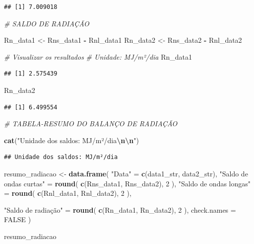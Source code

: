 \documentclass[
]{article}
\newenvironment{Shaded}{\begin{snugshade}}{\end{snugshade}}
\newcommand{\AttributeTok}[1]{\textcolor[rgb]{0.13,0.29,0.53}{#1}}
\newcommand{\CommentTok}[1]{\textcolor[rgb]{0.56,0.35,0.01}{\textit{#1}}}
\newcommand{\ConstantTok}[1]{\textcolor[rgb]{0.56,0.35,0.01}{#1}}
\newcommand{\DecValTok}[1]{\textcolor[rgb]{0.00,0.00,0.81}{#1}}
\newcommand{\FunctionTok}[1]{\textcolor[rgb]{0.13,0.29,0.53}{\textbf{#1}}}
\newcommand{\NormalTok}[1]{#1}
\newcommand{\OtherTok}[1]{\textcolor[rgb]{0.56,0.35,0.01}{#1}}
\newcommand{\SpecialCharTok}[1]{\textcolor[rgb]{0.81,0.36,0.00}{\textbf{#1}}}
\newcommand{\StringTok}[1]{\textcolor[rgb]{0.31,0.60,0.02}{#1}}
\begin{document}
\begin{verbatim}
## [1] 7.009018
\end{verbatim}

\begin{Shaded}
\begin{Highlighting}[]
\CommentTok{\# SALDO DE RADIAÇÃO}

\NormalTok{Rn\_data1 }\OtherTok{\textless{}{-}}\NormalTok{ Rns\_data1 }\SpecialCharTok{{-}}\NormalTok{ Rnl\_data1}
\NormalTok{Rn\_data2 }\OtherTok{\textless{}{-}}\NormalTok{ Rns\_data2 }\SpecialCharTok{{-}}\NormalTok{ Rnl\_data2}

\CommentTok{\# Visualizar os resultados}
\CommentTok{\# Unidade: MJ/m²/dia}
\NormalTok{Rn\_data1}
\end{Highlighting}
\end{Shaded}

\begin{verbatim}
## [1] 2.575439
\end{verbatim}

\begin{Shaded}
\begin{Highlighting}[]
\NormalTok{Rn\_data2}
\end{Highlighting}
\end{Shaded}

\begin{verbatim}
## [1] 6.499554
\end{verbatim}

\begin{Shaded}
\begin{Highlighting}[]
\CommentTok{\# TABELA{-}RESUMO DO BALANÇO DE RADIAÇÃO}

\FunctionTok{cat}\NormalTok{(}\StringTok{"Unidade dos saldos: MJ/m²/dia}\SpecialCharTok{\textbackslash{}n\textbackslash{}n}\StringTok{"}\NormalTok{)}
\end{Highlighting}
\end{Shaded}

\begin{verbatim}
## Unidade dos saldos: MJ/m²/dia
\end{verbatim}

\begin{Shaded}
\begin{Highlighting}[]
\NormalTok{resumo\_radiacao }\OtherTok{\textless{}{-}} \FunctionTok{data.frame}\NormalTok{(}
  \StringTok{"Data"} \OtherTok{=} \FunctionTok{c}\NormalTok{(data1\_str, data2\_str),}
  \StringTok{"Saldo de ondas curtas"} \OtherTok{=} \FunctionTok{round}\NormalTok{(}
    \FunctionTok{c}\NormalTok{(Rns\_data1, Rns\_data2),}
    \DecValTok{2}
\NormalTok{  ),}
  \StringTok{"Saldo de ondas longas"} \OtherTok{=} \FunctionTok{round}\NormalTok{(}
    \FunctionTok{c}\NormalTok{(Rnl\_data1, Rnl\_data2),}
    \DecValTok{2}
\NormalTok{  ),}
  
  \StringTok{"Saldo de radiação"} \OtherTok{=} \FunctionTok{round}\NormalTok{(}
    \FunctionTok{c}\NormalTok{(Rn\_data1, Rn\_data2),}
    \DecValTok{2}
\NormalTok{  ),}
  \AttributeTok{check.names =} \ConstantTok{FALSE}
\NormalTok{)}

\NormalTok{resumo\_radiacao}
\end{Highlighting}
\end{Shaded}
\end{document}
